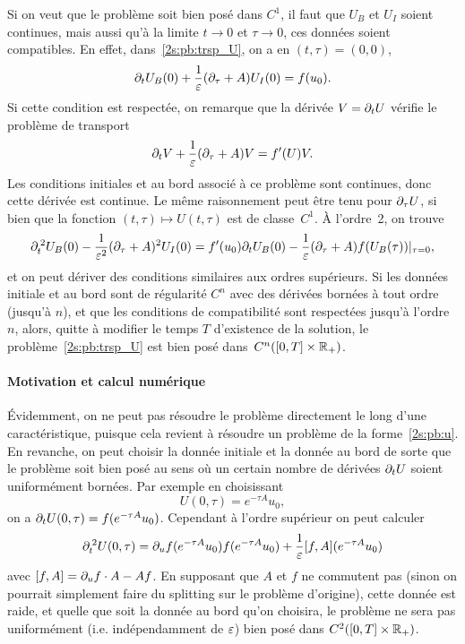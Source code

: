 Si on veut que le problème soit bien posé dans $C^1$, il faut que $U_B$ et $U_I$ soient continues, mais aussi qu'à la limite $t \rightarrow 0$ et $\tau \rightarrow 0$, ces données soient compatibles. En effet, dans~\eqref{2s:pb:trsp_U}, on a en $(t,\tau) = (0,0)$, 
\begin{equation*}
    \partial_t U_B(0) + \frac{1}{\varepsilon}(\partial_\tau + A)U_I(0) = f(u_0) .
\end{equation*}
Si cette condition est respectée, on remarque que la dérivée $V = \partial_t U$ vérifie le problème de transport 
\begin{equation*}
    \partial_t V + \frac{1}{\varepsilon}(\partial_\tau + A) V = f'(U)V .
\end{equation*}
Les conditions initiales et au bord associé à ce problème sont continues, donc cette dérivée est continue. Le même raisonnement peut être tenu pour $\partial_\tau U$, si bien que la fonction $(t,\tau) \mapsto U(t,\tau)$ est de classe~$C^1$. À l'ordre~2, on trouve
\begin{equation*}
    \partial_t^{\: 2} U_B(0) - \frac{1}{\varepsilon^2}(\partial_\tau + A)^2 U_I(0)
    = f'(u_0)\partial_t U_B(0) 
        - \frac{1}{\varepsilon}(\partial_\tau + A) f(U_B(\tau))|_{\tau = 0} ,
\end{equation*}
et on peut dériver des conditions similaires aux ordres supérieurs. Si les données initiale et au bord sont de régularité $C^n$ avec des dérivées bornées à tout ordre (jusqu'à $n$), et que les conditions de compatibilité sont respectées jusqu'à l'ordre $n$, alors, quitte à modifier le temps $T$ d'existence de la solution, le problème~\eqref{2s:pb:trsp_U} est bien posé dans~$C^n([0,T] \times \mathbb{R}_+)$.

\paragraph{Motivation et calcul numérique\\}

Évidemment, on ne peut pas résoudre le problème directement le long d'une caractéristique, puisque cela revient à résoudre un problème de la forme~\eqref{2s:pb:u}. En revanche, on peut choisir la donnée initiale et la donnée au bord de sorte que le problème soit bien posé au sens où un certain nombre de dérivées $\partial_t U$ soient uniformément bornées. Par exemple en choisissant 
\begin{equation*}
    U(0,\tau) = e^{-\tau A} u_0 ,
\end{equation*}
on a $\partial_t U (0,\tau) = f(e^{-\tau A} u_0)$. Cependant à l'ordre supérieur on peut calculer 
\begin{equation*}
    \partial_t^{\:2}U(0,\tau) = \partial_u f(e^{-\tau A}u_0)f(e^{-\tau A}u_0) + \frac{1}{\varepsilon} [f,A](e^{-\tau A} u_0) 
\end{equation*}
avec $[f,A] = \partial_u f \cdot A - A f$. En supposant que $A$ et $f$ ne commutent pas (sinon on pourrait simplement faire du splitting sur le problème d'origine), cette donnée est raide, et quelle que soit la donnée au bord qu'on choisira, le problème ne sera pas uniformément (i.e. indépendamment de $\varepsilon$) bien posé dans $C^2([0,T] \times \mathbb{R}_+)$. 


